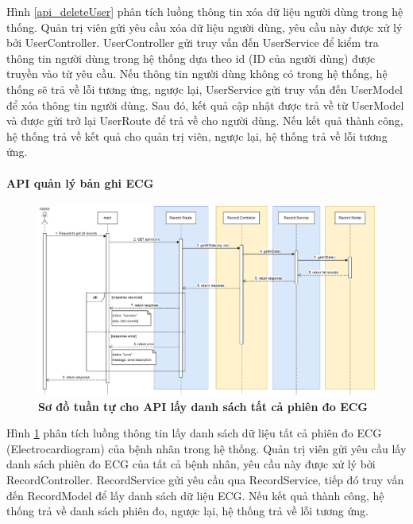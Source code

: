 Hình \ref{api_deleteUser} phân tích luồng thông tin xóa dữ liệu người dùng trong hệ thống. Quản trị viên gửi yêu cầu xóa dữ liệu người dùng, 
yêu cầu này được xử lý bởi UserController. UserController gửi truy vấn đến UserService để kiểm tra thông tin người dùng trong hệ thống dựa theo id (ID của người dùng) được truyền vào từ yêu cầu. 
Nếu thông tin người dùng không có trong hệ thống, hệ thống sẽ trả về lỗi tương ứng, ngược lại, UserService gửi truy vấn đến UserModel để xóa thông tin người dùng. Sau đó, kết quả cập nhật được trả về 
từ UserModel và được gửi trở lại UserRoute để trả về cho người dùng. Nếu kết quả thành công, hệ thống trả về kết quả cho quản trị viên, ngược lại, hệ thống trả về lỗi tương ứng.



\paragraph{API quản lý bản ghi ECG}
\mbox{}

\begin{figure}[H]
  \centering
  \includegraphics[scale=0.35]{Images/sequence_api/getAllRecord.png}
  \caption[Sơ đồ tuần tự cho API lấy danh sách tất cả phiên đo ECG ]{\bfseries \fontsize{12pt}{0pt}
  \selectfont Sơ đồ tuần tự cho API lấy danh sách tất cả phiên đo ECG }
  \label{api_getAllEcgRecords} %
\end{figure}
Hình \ref{api_getAllEcgRecords} phân tích luồng thông tin lấy danh sách dữ liệu tất cả phiên đo ECG (Electrocardiogram) của bệnh nhân trong hệ thống. Quản trị viên gửi yêu cầu lấy danh sách phiên đo ECG của tất cả bệnh nhân, 
yêu cầu này được xử lý bởi RecordController. RecordService gửi yêu cầu qua RecordService, tiếp đó truy vấn đến RecordModel để lấy danh sách dữ liệu ECG. Nếu kết quả thành công, hệ thống trả về danh sách phiên đo, 
ngược lại, hệ thống trả về lỗi tương ứng.

